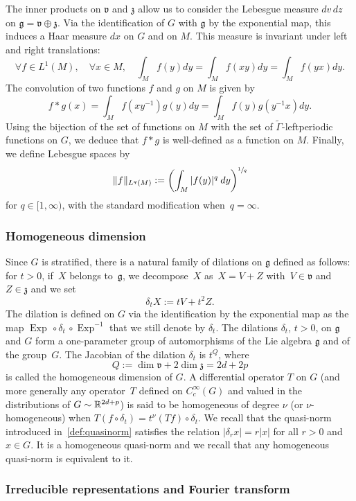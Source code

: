 \documentclass[JEP,XML,SOM,Unicode,published]{cedram}
\DeclareMathOperator{\Exp}{Exp}
\theoremstyle{plain}
\theoremstyle{definition}
\def\R{{\mathbb R}}
\begin{document}
The inner products on $\mathfrak v$ and ${\mathfrak z}$ allow us to consider the Lebesgue measure $dv\, dz$ on ${\mathfrak g}={\mathfrak v}\oplus{\mathfrak z}$. Via the identification of $G$ with ${\mathfrak g}$ by the exponential map, this induces a Haar measure $dx$ on $G$ and on $M$. This measure is invariant under left and right translations:
\[
\forall f \in L^1(M), \quad \forall x \in M, \quad \int_M f(y) dy = \int_M f(x y)dy= \int_M f(y x)dy.
\]
The convolution of two functions $f$ and $g$ on $M$ is given by
\[
f*g(x)=\int_M f(xy^{-1})g(y) dy=\int_Mf(y) g(y^{-1} x) dy.
\]
Using the bijection of the set of functions on $M$ with the set of $\widetilde{\Gamma}$-leftperiodic functions on $G$, we deduce that $f*g$ is well-defined as a function on $M$.
Finally, we define Lebesgue spaces by
\[
\|f\|_{L^q (M)} := \biggl(\int_M |f(y)|^q \: dy \biggr)^{\sfrac1q}
\]
for $q\in[1,\infty)$, with the standard modification when~$q=\infty$.

\subsubsection{Homogeneous dimension}
Since $G$ is stratified, there is a natural family of dilations on ${\mathfrak g}$ defined as follows: for $t>0$, if~$X$ belongs to~$ {\mathfrak g}$, we decompose~$X$ as~$ X=V+Z$ with~$V\in {\mathfrak v}$ and~$Z\in {\mathfrak z}$ and we set
\[
\delta_t X:=tV+t^2Z.
\]
The dilation is defined on $G$ via the identification by the exponential map as the map $\Exp\, \circ \delta_t \, \circ \Exp^{-1}$ that we still denote by $\delta_t$.
The dilations $\delta_t$, $t>0$, on $\mathfrak g$ and $G$ form a one-parameter group of automorphisms of the Lie algebra $\mathfrak g$ and of the group~$G$.
The Jacobian of the dilation $\delta_t$ is $t^Q$, where
\[
Q:=\dim {\mathfrak v} +2\dim {\mathfrak z} = 2d+2p
\]
is called the homogeneous dimension of $G$.
A differential operator $T$ on $G$
(and more generally any operator~$T$ defined on $C^\infty_c(G)$ and valued in the distributions of $G\sim\nobreak \R^{2d+p}$)
is said to be homogeneous of degree $\nu$ (or $\nu$-homogeneous) when
$
T (f\circ \delta_t) = t^\nu (Tf)\circ \delta_t.
$
We recall that the quasi-norm introduced in~\eqref{def:quasinorm} satisfies the relation $|\delta_r x|= r|x|$ for all $r>0$ and $x\in G$. It is a homogeneous quasi-norm and we recall that any homogeneous quasi-norm is equivalent to it.

\subsubsection{Irreducible representations and Fourier transform}
\end{document}
